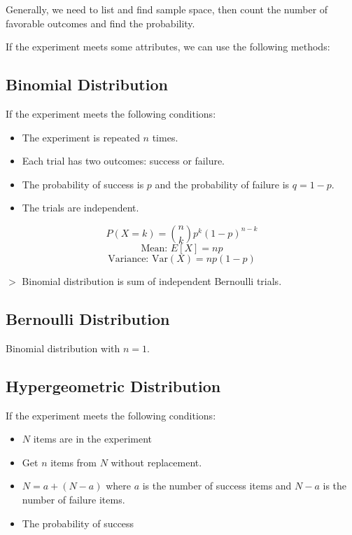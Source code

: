 \documentclass[12pt,a4paper]{article}
\newcommand{\remark}[1]{
    {\small $>$ {\color{blue} #1}}
}
\begin{document}
Generally, we need to list and find sample space, then count the number of favorable outcomes and find the probability.

If the experiment meets some attributes, we can use the following methods:

\subsection*{Binomial Distribution}

If the experiment meets the following conditions:

\begin{itemize}
    \item The experiment is repeated $n$ times.
    \item Each trial has two outcomes: success or failure.
    \item The probability of success is $p$ and the probability of failure is $q = 1 - p$.
    \item The trials are independent.
\end{itemize}

\[P(X = k) = \binom{n}{k} p^k (1-p)^{n-k}\]
\[\text{Mean: } E[X] = np\]
\[\text{Variance: } \text{Var}(X) = np(1-p)\]

\remark{Binomial distribution is sum of independent Bernoulli trials.}

\subsection*{Bernoulli Distribution}

Binomial distribution with $n = 1$.

\subsection*{Hypergeometric Distribution}

If the experiment meets the following conditions:

\begin{itemize}
    \item $N$ items are in the experiment
    \item Get $n$ items from $N$ without replacement.
    \item $N = a + (N-a)$ where $a$ is the number of success items and $N-a$ is the number of failure items.
    \item The probability of success
\end{itemize}
\end{document}
